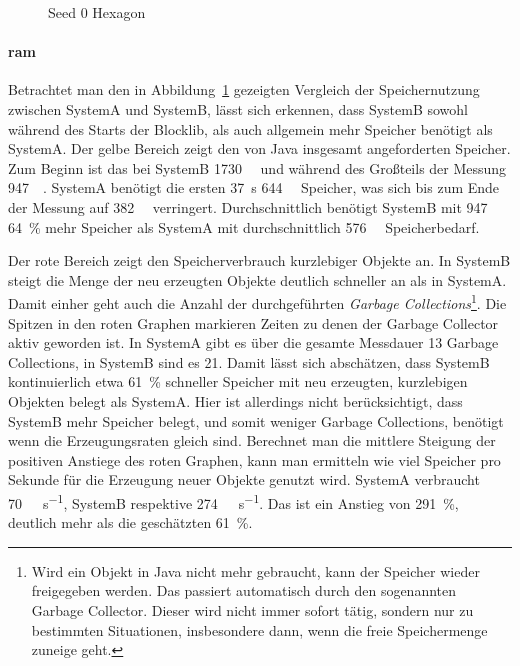 \begin{figure}[!htbp]
	\caption{Seed 0 Hexagon}\label{fig:seed-0-hexagon-mem}
\end{figure} 
\paragraph{\ac{ram}} Betrachtet man den in Abbildung~\ref{fig:seed-0-hexagon-mem} gezeigten Vergleich der Speichernutzung zwischen SystemA und SystemB, lässt sich erkennen, dass SystemB sowohl während des Starts der Blocklib, als auch allgemein mehr Speicher benötigt als SystemA. Der gelbe Bereich zeigt den von Java insgesamt angeforderten Speicher. Zum Beginn ist das bei SystemB \SI{1730}{\mega\byte} und während des Großteils der Messung \SI{947}{\mega\byte}. SystemA benötigt die ersten \SI{37}{\second} \SI{644}{\mega\byte} Speicher, was sich bis zum Ende der Messung auf \SI{382}{\mega\byte} verringert. Durchschnittlich benötigt SystemB mit \SI{947}{\mega\byte} \SI{64}{\percent} mehr Speicher als SystemA mit durchschnittlich \SI{576}{\mega\byte} Speicherbedarf.

Der rote Bereich zeigt den Speicherverbrauch kurzlebiger Objekte an. In SystemB steigt die Menge der neu erzeugten Objekte deutlich schneller an als in SystemA. Damit einher geht auch die Anzahl der durchgeführten \emph{Garbage Collections}\footnote{Wird ein Objekt in Java nicht mehr gebraucht, kann der Speicher wieder freigegeben werden. Das passiert automatisch durch den sogenannten Garbage Collector. Dieser wird nicht immer sofort tätig, sondern nur zu bestimmten Situationen, insbesondere dann, wenn die freie Speichermenge zuneige geht.}. Die Spitzen in den roten Graphen markieren Zeiten zu denen der Garbage Collector aktiv geworden ist. In SystemA gibt es über die gesamte Messdauer 13 Garbage Collections, in SystemB sind es 21. Damit lässt sich abschätzen, dass SystemB kontinuierlich etwa \SI{61}{\percent} schneller Speicher mit neu erzeugten, kurzlebigen Objekten belegt als SystemA. Hier ist allerdings nicht berücksichtigt, dass SystemB mehr Speicher belegt, und somit  weniger Garbage Collections, benötigt wenn die Erzeugungsraten gleich sind. Berechnet man die mittlere Steigung der positiven Anstiege des roten Graphen, kann man ermitteln wie viel Speicher pro Sekunde für die Erzeugung neuer Objekte genutzt wird. SystemA verbraucht \SI{70}{\mega\byte\per\second}, SystemB respektive \SI{274}{\mega\byte\per\second}. Das ist ein Anstieg von \SI{291}{\percent}, deutlich mehr als die geschätzten \SI{61}{\percent}.